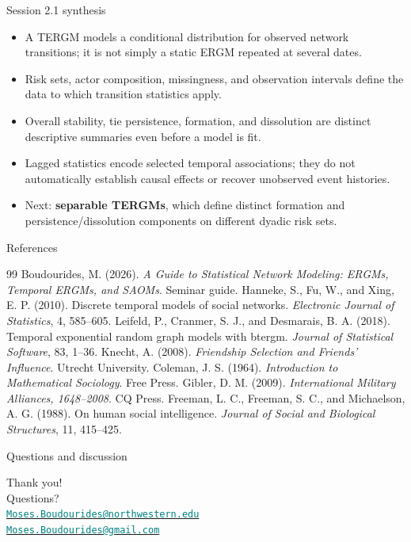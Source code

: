 \documentclass[aspectratio=169,11pt]{beamer}
\newcommand{\term}[1]{\textbf{\color{nupurple}#1}}
\begin{document}
\begin{frame}{Session 2.1 synthesis}
\begin{itemize}
\item A TERGM models a conditional distribution for observed network transitions; it is not simply a static ERGM repeated at several dates.
\item Risk sets, actor composition, missingness, and observation intervals define the data to which transition statistics apply.
\item Overall stability, tie persistence, formation, and dissolution are distinct descriptive summaries even before a model is fit.
\item Lagged statistics encode selected temporal associations; they do not automatically establish causal effects or recover unobserved event histories.
\item Next: \term{separable TERGMs}, which define distinct formation and persistence/dissolution components on different dyadic risk sets.
\end{itemize}
\end{frame}

\begin{frame}{References}
\footnotesize
\begin{thebibliography}{99}
 Boudourides, M. (2026). \emph{A Guide to Statistical Network Modeling: ERGMs, Temporal ERGMs, and SAOMs}. Seminar guide.
 Hanneke, S., Fu, W., and Xing, E. P. (2010). Discrete temporal models of social networks. \emph{Electronic Journal of Statistics}, 4, 585--605.
 Leifeld, P., Cranmer, S. J., and Desmarais, B. A. (2018). Temporal exponential random graph models with btergm. \emph{Journal of Statistical Software}, 83, 1--36.
 Knecht, A. (2008). \emph{Friendship Selection and Friends' Influence}. Utrecht University.
 Coleman, J. S. (1964). \emph{Introduction to Mathematical Sociology}. Free Press.
 Gibler, D. M. (2009). \emph{International Military Alliances, 1648--2008}. CQ Press.
 Freeman, L. C., Freeman, S. C., and Michaelson, A. G. (1988). On human social intelligence. \emph{Journal of Social and Biological Structures}, 11, 415--425.
\end{thebibliography}
\end{frame}

\begin{frame}{Questions and discussion}
\begin{center}
\Large{Thank you!}\\[2ex]
\normalsize{Questions?}\\[5ex]
\href{mailto:Moses.Boudourides@northwestern.edu}{\textcolor{teal}{\small\texttt{Moses.Boudourides@northwestern.edu}}}\\[0.8em]
\href{mailto:Moses.Boudourides@gmail.com}{\textcolor{teal}{\small\texttt{Moses.Boudourides@gmail.com}}}
\end{center}
\end{frame}

\end{document}
